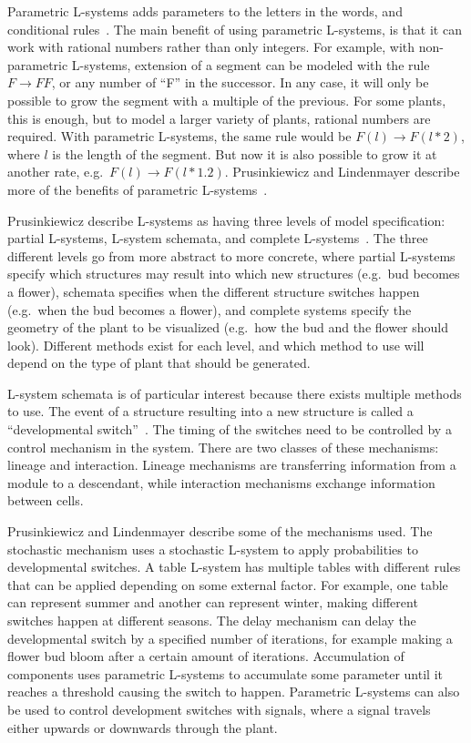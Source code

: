Parametric L-systems adds parameters to the letters in the words, and conditional rules~\cite{2012Prusinkiewicz}.
The main benefit of using parametric L-systems, is that it can work with rational numbers rather than only integers.
For example, with non-parametric L-systems, extension of a segment can be modeled with the rule $F\rightarrow FF$, or any number of ``F'' in the successor.
In any case, it will only be possible to grow the segment with a multiple of the previous.
For some plants, this is enough, but to model a larger variety of plants, rational numbers are required.
With parametric L-systems, the same rule would be $F(l)\rightarrow F(l*2)$, where $l$ is the length of the segment.
But now it is also possible to grow it at another rate, e.g.\ $F(l)\rightarrow F(l*1.2)$.
Prusinkiewicz and Lindenmayer describe more of the benefits of parametric L-systems~\cite{2012Prusinkiewicz}.

Prusinkiewicz describe L-systems as having three levels of model specification: partial L-systems, L-system schemata, and complete L-systems~\cite{2012Prusinkiewicz}.
The three different levels go from more abstract to more concrete, where partial L-systems specify which structures may result into which new structures (e.g.\ bud becomes a flower), schemata specifies when the different structure switches happen (e.g.\ when the bud becomes a flower), and complete systems specify the geometry of the plant to be visualized (e.g.\ how the bud and the flower should look).
Different methods exist for each level, and which method to use will depend on the type of plant that should be generated.

L-system schemata is of particular interest because there exists multiple methods to use.
The event of a structure resulting into a new structure is called a ``developmental switch''~\cite{2012Prusinkiewicz}.
The timing of the switches need to be controlled by a control mechanism in the system.
There are two classes of these mechanisms: lineage and interaction.
Lineage mechanisms are transferring information from a module to a descendant, while interaction mechanisms exchange information between cells.

Prusinkiewicz and Lindenmayer describe some of the mechanisms used.
The stochastic mechanism uses a stochastic L-system to apply probabilities to developmental switches.
A table L-system has multiple tables with different rules that can be applied depending on some external factor.
For example, one table can represent summer and another can represent winter, making different switches happen at different seasons.
The delay mechanism can delay the developmental switch by a specified number of iterations, for example making a flower bud bloom after a certain amount of iterations.
Accumulation of components uses parametric L-systems to accumulate some parameter until it reaches a threshold causing the switch to happen.
Parametric L-systems can also be used to control development switches with signals, where a signal travels either upwards or downwards through the plant.~\cite{2012Prusinkiewicz}


